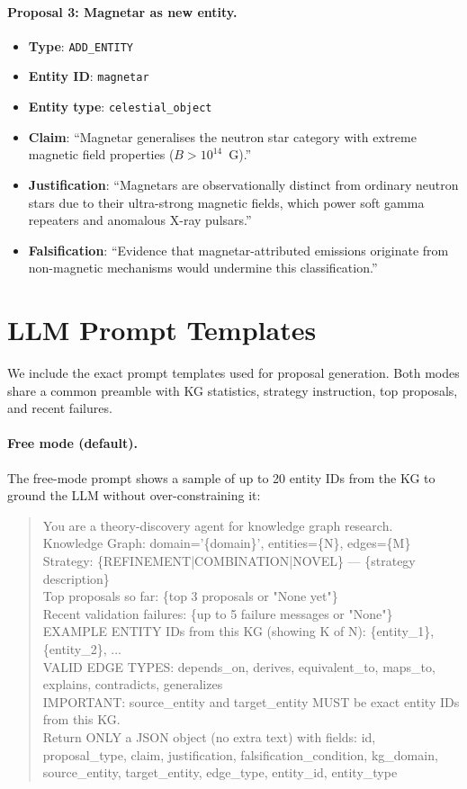 \paragraph{Proposal 3: Magnetar as new entity.}
\begin{itemize}[nosep]
  \item \textbf{Type}: \texttt{ADD\_ENTITY}
  \item \textbf{Entity ID}: \texttt{magnetar}
  \item \textbf{Entity type}: \texttt{celestial\_object}
  \item \textbf{Claim}: ``Magnetar generalises the neutron star category with
    extreme magnetic field properties ($B > 10^{14}$~G).''
  \item \textbf{Justification}: ``Magnetars are observationally distinct from
    ordinary neutron stars due to their ultra-strong magnetic fields, which power
    soft gamma repeaters and anomalous X-ray pulsars.''
  \item \textbf{Falsification}: ``Evidence that magnetar-attributed emissions
    originate from non-magnetic mechanisms would undermine this classification.''
\end{itemize}

\section{LLM Prompt Templates}\label{app:prompts}

We include the exact prompt templates used for proposal generation.  Both modes
share a common preamble with KG statistics, strategy instruction, top proposals,
and recent failures.

\paragraph{Free mode (default).}
The free-mode prompt shows a sample of up to 20 entity IDs from the KG to
ground the LLM without over-constraining it:
\begin{quote}\small\ttfamily
You are a theory-discovery agent for knowledge graph research.\\
Knowledge Graph: domain='\{domain\}', entities=\{N\}, edges=\{M\}\\[4pt]
Strategy: \{REFINEMENT|COMBINATION|NOVEL\} --- \{strategy description\}\\[4pt]
Top proposals so far: \{top 3 proposals or "None yet"\}\\
Recent validation failures: \{up to 5 failure messages or "None"\}\\[4pt]
EXAMPLE ENTITY IDs from this KG (showing K of N): \{entity\_1\}, \{entity\_2\}, ...\\
VALID EDGE TYPES: depends\_on, derives, equivalent\_to, maps\_to, explains,
contradicts, generalizes\\
IMPORTANT: source\_entity and target\_entity MUST be exact entity IDs from this
KG.\\[4pt]
Return ONLY a JSON object (no extra text) with fields: id, proposal\_type,
claim, justification, falsification\_condition, kg\_domain, source\_entity,
target\_entity, edge\_type, entity\_id, entity\_type
\end{quote}

